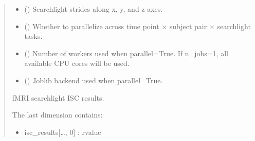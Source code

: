 \documentclass[letterpaper,10pt,english]{sphinxhowto}
\begin{document}
\begin{fulllineitems}
\begin{quote}
\begin{description}
\begin{itemize}
\item {} 
\sphinxAtStartPar
{} (\sphinxstyleliteralemphasis{\sphinxupquote{, }}\sphinxstyleliteralemphasis{\sphinxupquote{(}}\sphinxstyleliteralemphasis{\sphinxupquote{, }}\sphinxstyleliteralemphasis{\sphinxupquote{, }}\sphinxstyleliteralemphasis{\sphinxupquote{)}}) \textendash{} Searchlight strides along x, y, and z axes.

\item {} 
\sphinxAtStartPar
{} (\sphinxstyleliteralemphasis{\sphinxupquote{, }}) \textendash{} Whether to parallelize across time point × subject pair × searchlight tasks.

\item {} 
\sphinxAtStartPar
{} (\sphinxstyleliteralemphasis{\sphinxupquote{, }}) \textendash{} Number of workers used when parallel=True.
If n\_jobs=\sphinxhyphen{}1, all available CPU cores will be used.

\item {} 
\sphinxAtStartPar
{} (\sphinxstyleliteralemphasis{\sphinxupquote{, }}\sphinxstyleliteralemphasis{\sphinxupquote{, }}) \textendash{} Joblib backend used when parallel=True.

\end{itemize}

\sphinxAtStartPar

\sphinxAtStartPar
{} \textendash{} fMRI searchlight ISC results.

\sphinxAtStartPar
The last dimension contains:
\begin{itemize}
\item {} 
\sphinxAtStartPar
isc\_results{[}…, 0{]} : r\sphinxhyphen{}value


\end{itemize}
\end{description}
\end{quote}
\end{fulllineitems}
\end{document}
